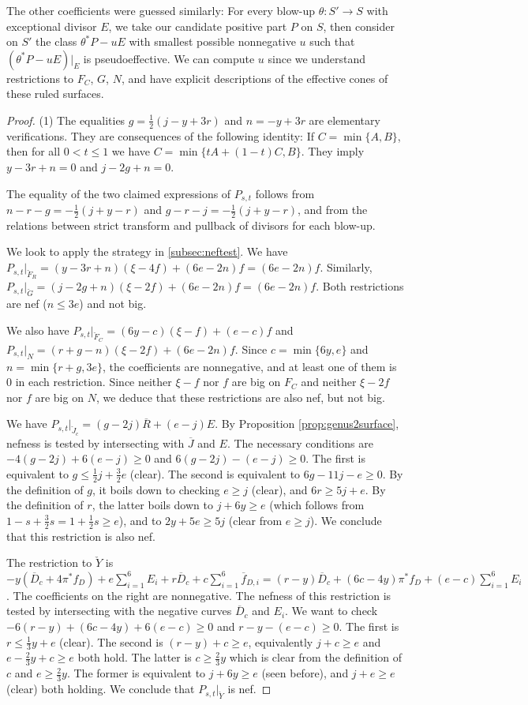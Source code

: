 \documentclass[12pt]{amsart}
\theoremstyle{definition}
\renewcommand{\geq}{\geqslant}
\renewcommand{\leq}{\leqslant}
\newcommand{\?}{ \circled{{\large\bf ?}}}
\begin{document}
The other coefficients were guessed similarly: For every blow-up $\theta:S'\to S$ with exceptional divisor $E$, we take our candidate positive part $P$ on $S$, then consider on $S'$ the class $\theta^*P-uE$ with smallest possible nonnegative $u$ such that $(\theta^*P-uE)|_E$ is pseudoeffective. 
We can compute $u$ since we understand restrictions to $F_C$, $G$, $N$, and have explicit descriptions of the effective cones of these ruled surfaces.

\begin{proof} (1) 
	The equalities $g=\frac12(j-y+3r)$ and $n=-y+3r$ are elementary verifications. They are consequences of the following identity: If $C=\min\{A,B\}$, then for all $0< t\leq 1$ we have $C=\min\{tA+(1-t)C,B\}$. They imply $y-3r+n=0$ and $j-2g+n=0$.
	
The equality of the two claimed expressions of $P_{s,t}$ follows from $n-r-g=-\frac 12(j+y-r)$ and $g-r-j=-\frac 12(j+y-r)$, and from the relations between strict transform and pullback of divisors for each blow-up.	

	We look to apply the strategy in \ref{subsec:neftest}.
We have $P_{s,t}|_{\check F_R}=(y-3r+n)(\xi-4f)+(6e-2n)f=(6e-2n)f$. 
Similarly, $P_{s,t}|_{\check G}=(j-2g+n)(\xi-2f)+(6e-2n)f=(6e-2n)f$. 
Both restrictions are nef ($n\leq 3e$) and not big.

We also have $P_{s,t}|_{\check F_C}=(6y-c)(\xi-f)+(e-c)f$ and $P_{s,t}|_{N}=(r+g-n)(\xi-2f)+(6e-2n)f$. Since $c=\min\{6y,e\}$ and $n=\min\{r+g,3e\}$, the coefficients are nonnegative, and at least one of them is 0 in each restriction. Since neither $\xi-f$ nor $f$ are big on $F_C$ and neither $\xi-2f$ nor $f$ are big on $N$, we deduce that these restrictions are also nef, but not big.

We have $P_{s,t}|_{\check J_c}=(g-2j)\overline R+(e-j)E$. By Proposition \ref{prop:genus2surface}, nefness is tested by intersecting with $\overline J$ and $E$. The necessary conditions are $-4(g-2j)+6(e-j)\geq0$ and $6(g-2j)-(e-j)\geq0$. The first is equivalent to $g\leq\frac 12j+\frac 32e$ (clear). The second is equivalent to $6g-11j-e\geq 0$. By the definition of $g$, it boils down to checking $e\geq j$ (clear), and $6r\geq 5j+e$. By the definition of $r$, the latter boils down to $j+6y\geq e$ (which follows from $1-s+\frac 32s=1+\frac 12s\geq e$), and to $2y+5e\geq 5j$ (clear from $e\geq j$). We conclude that this restriction is also nef. 

The restriction to $\check Y$ is $-y(\overline D_c+4\pi^*f_D)+e\sum_{i=1}^6E_i+r\overline D_c+c\sum_{i=1}^6\overline f_{D,i}=(r-y)\overline D_c+(6c-4y)\pi^*f_D+(e-c)\sum_{i=1}^6E_i$. The coefficients on the right are nonnegative. The nefness of this restriction is tested by intersecting with the negative curves $\overline D_c$ and $E_i$.
We want to check $-6(r-y)+(6c-4y)+6(e-c)\geq0$ and $r-y-(e-c)\geq 0$. The first is $r\leq\frac 13y+e$ (clear). The second is $(r-y)+c\geq e$, equivalently $j+c\geq e$ and $e-\frac 23y+c\geq e$ both hold. The latter is $c\geq\frac 23y$ which is clear from the definition of $c$ and $e\geq\frac 23y$. The former is equivalent to $j+6y\geq e$ (seen before), and $j+e\geq e$ (clear) both holding. We conclude that $P_{s,t}|_{\check Y}$ is nef.


\end{proof}
\end{document}
